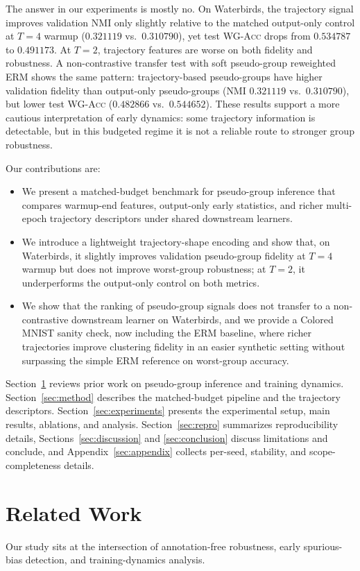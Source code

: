 \documentclass{article}
\newcommand{\wg}{\textsc{WG-Acc}}
\newcommand{\nmi}{\textsc{NMI}}
\begin{document}
The answer in our experiments is mostly no. On Waterbirds, the trajectory signal improves validation \nmi{} only slightly relative to the matched output-only control at $T=4$ warmup ($0.321119$ vs.\ $0.310790$), yet test \wg{} drops from $0.534787$ to $0.491173$. At $T=2$, trajectory features are worse on both fidelity and robustness. A non-contrastive transfer test with soft pseudo-group reweighted ERM shows the same pattern: trajectory-based pseudo-groups have higher validation fidelity than output-only pseudo-groups (\nmi{} $0.321119$ vs.\ $0.310790$), but lower test \wg{} ($0.482866$ vs.\ $0.544652$). These results support a more cautious interpretation of early dynamics: some trajectory information is detectable, but in this budgeted regime it is not a reliable route to stronger group robustness.

Our contributions are:
\begin{itemize}
  \item We present a matched-budget benchmark for pseudo-group inference that compares warmup-end features, output-only early statistics, and richer multi-epoch trajectory descriptors under shared downstream learners.
  \item We introduce a lightweight trajectory-shape encoding and show that, on Waterbirds, it slightly improves validation pseudo-group fidelity at $T=4$ warmup but does not improve worst-group robustness; at $T=2$, it underperforms the output-only control on both metrics.
  \item We show that the ranking of pseudo-group signals does not transfer to a non-contrastive downstream learner on Waterbirds, and we provide a Colored MNIST sanity check, now including the ERM baseline, where richer trajectories improve clustering fidelity in an easier synthetic setting without surpassing the simple ERM reference on worst-group accuracy.
\end{itemize}

Section~\ref{sec:related} reviews prior work on pseudo-group inference and training dynamics. Section~\ref{sec:method} describes the matched-budget pipeline and the trajectory descriptors. Section~\ref{sec:experiments} presents the experimental setup, main results, ablations, and analysis. Section~\ref{sec:repro} summarizes reproducibility details, Sections~\ref{sec:discussion} and \ref{sec:conclusion} discuss limitations and conclude, and Appendix~\ref{sec:appendix} collects per-seed, stability, and scope-completeness details.

\section{Related Work}
\label{sec:related}
Our study sits at the intersection of annotation-free robustness, early spurious-bias detection, and training-dynamics analysis.
\end{document}
